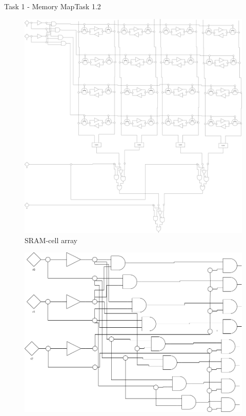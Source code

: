 \begin{frame}[allowframebreaks]{Task 1 - Memory Map}{Task 1.2\vspace{0.25cm}}
  \begin{figure}
    \centering
    \includegraphics[height=0.6\paperheight]{./figures/sram.png}
    \caption{SRAM-cell array}
  \end{figure}
  \begin{figure}
    \centering
    \includegraphics[height=0.6\paperheight]{./figures/3BitDecoder.png}

\end{figure}
\end{frame}
